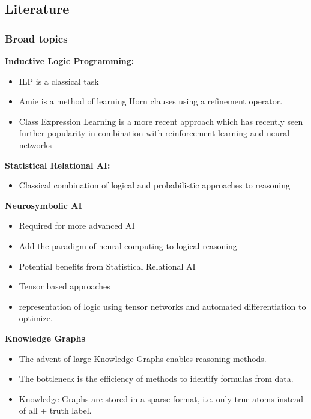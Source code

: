 \subsection{Literature}

\subsubsection{Broad topics}

\textbf{Inductive Logic Programming:}
\begin{itemize}
	\item ILP is a classical task \cite{muggleton_inductive_1994}
	\item Amie \cite{galarraga_amie_2013} is a method of learning Horn clauses using a refinement operator.
	\item Class Expression Learning \cite{lehmann_class_2011} is a more recent approach which has recently seen further popularity in combination with reinforcement learning \cite{demir_drill-_2021} and neural networks \cite{kouagou_neural_2022, pesquita_neural_2023}
\end{itemize}

\textbf{Statistical Relational AI:} \cite{getoor_introduction_2019}
\begin{itemize}
	\item Classical combination of logical and probabilistic approaches to reasoning 
\end{itemize}

\textbf{Neurosymbolic AI}
\begin{itemize}
	\item Required for more advanced AI \cite{hochreiter_toward_2022}
	\item Add the paradigm of neural computing to logical reasoning 
	\item Potential benefits from Statistical Relational AI \cite{marra_statistical_2024}
	\item Tensor based approaches \cite{cohen_tensorlog_2020}
	\item \cite{badreddine_logic_2022} representation of logic using tensor networks and automated differentiation to optimize.
\end{itemize}


\textbf{Knowledge Graphs}
\cite{hogan_knowledge_2021}
\begin{itemize}
	\item The advent of large Knowledge Graphs enables reasoning methods. 
	\item The bottleneck is the efficiency of methods to identify formulas from data.
	\item Knowledge Graphs are stored in a sparse format, i.e. only true atoms instead of all + truth label.
\end{itemize}


